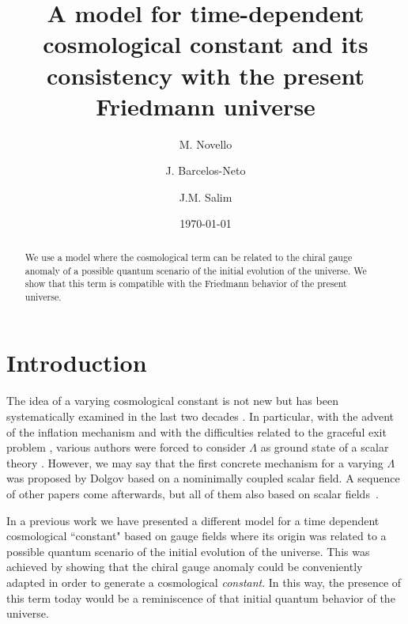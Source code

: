 \documentclass[a4paper,twocolumn,prd,superscriptaddress,nofootinbib,showpacs]
{revtex4}
\begin{document}
\title{A model for time-dependent cosmological constant and its
consistency with the present Friedmann universe}

\author{M. Novello}
\author{J. Barcelos-Neto}
\author{J.M. Salim}

\date{\today}

\begin{abstract}
We use a model where the cosmological term can be related to the
chiral gauge anomaly of a possible quantum scenario of the initial
evolution of the universe. We show that this term is compatible with
the Friedmann behavior of the present universe.
\end{abstract}


\maketitle

\section{Introduction}
The idea of a varying cosmological constant is not new but has been
systematically examined in the last two decades \cite{Overduin}. In
particular, with the advent of the inflation mechanism and with the
difficulties related to the graceful exit problem \cite{Kaloper},
various authors were forced to consider $\Lambda$ as ground state of a
scalar theory \cite{Ellis}. However, we may say that the first
concrete mechanism for a varying $\Lambda$ was proposed by Dolgov
\cite{Dolgov} based on a nominimally coupled scalar field. A sequence
of other papers come afterwards, but all of them also based on scalar
fields~\cite{Ozer}.

\medskip
In a previous work \cite{Novello} we have presented a different model
for a time dependent cosmological ``constant" based on gauge fields
where its origin was related to a possible quantum scenario of the
initial evolution of the universe. This was achieved by showing that
the chiral gauge anomaly could be conveniently adapted in order to
generate a cosmological {\it constant}. In this way, the presence of
this term today would be a reminiscence of that initial quantum
behavior of the universe.
\end{document}
